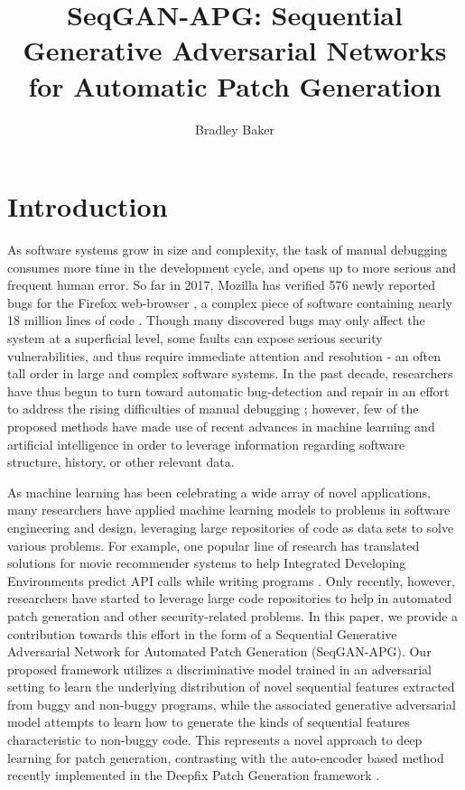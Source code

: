\documentclass[sigconf]{acmart}
\begin{document}
\title{SeqGAN-APG: Sequential Generative Adversarial Networks for Automatic Patch Generation}


\author{Bradley Baker}

\maketitle

\section{Introduction}
\label{sec:intro}
As software systems grow in size and complexity, the task of manual debugging consumes more time in the development cycle, and opens up to more serious and frequent human error. So far in 2017, Mozilla has verified 576 newly reported bugs for the Firefox web-browser \cite{FirefoxBugdays}, a complex piece of software containing nearly 18 million lines of code \cite{FirefoxOpen}. Though many discovered bugs may only affect the system at a superficial level, some faults can expose serious security vulnerabilities, and thus require immediate attention and resolution - an often tall order in large and complex software systems. In the past decade, researchers have thus begun to turn toward automatic bug-detection and repair in an effort to address the rising difficulties of manual debugging \cite{arcuri2008automation}; however, few of the proposed methods have made use of recent advances in machine learning and artificial intelligence in order to leverage information regarding software structure, history, or other relevant data.

As machine learning has been celebrating a wide array of novel applications, many researchers have applied machine learning models to problems in software engineering and design, leveraging large repositories of code as data sets to solve various problems. For example, one popular line of research has translated solutions for movie recommender systems to help Integrated Developing Environments predict API calls while writing programs \cite{bruch2009codecomplete,asaduzzaman2014cscc,robillard2010recommendation}. Only recently, however,  researchers have started to leverage large code repositories to help in automated patch generation and other security-related problems. In this paper, we provide a contribution towards this effort in the form of a Sequential Generative Adversarial Network for Automated Patch Generation (SeqGAN-APG). Our proposed framework utilizes a discriminative model trained in an adversarial setting to learn the underlying distribution of novel sequential features extracted from buggy and non-buggy programs, while the associated generative adversarial model attempts to learn how to generate the kinds of sequential features characteristic to non-buggy code. This represents a novel approach to deep learning for patch generation, contrasting with the auto-encoder based method recently implemented in the Deepfix Patch Generation framework \cite{gupta2017deepfix}.
\end{document}
